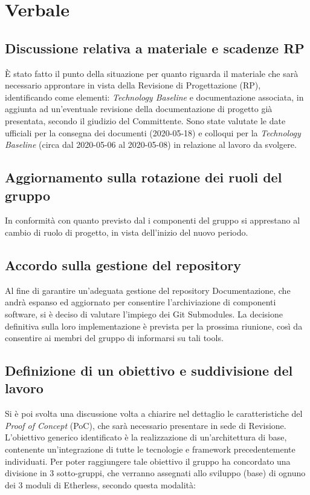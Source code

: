 \section{Verbale}

	\subsection{Discussione relativa a materiale e scadenze RP}
	È stato fatto il punto della situazione per quanto riguarda il materiale che sarà necessario approntare in vista della Revisione di Progettazione (RP), identificando come elementi: \textit{Technology Baseline} e documentazione associata, in aggiunta ad un'eventuale revisione della documentazione di progetto già presentata, secondo il giudizio del Committente.
	Sono state valutate le date ufficiali per la consegna dei documenti (2020-05-18) e colloqui per la \textit{Technology Baseline} (circa dal 2020-05-06 al 2020-05-08) in relazione al lavoro da svolgere.

	\subsection{Aggiornamento sulla rotazione dei ruoli del gruppo}
	In conformità con quanto previsto dal \PdP{} i componenti del gruppo si apprestano al cambio di ruolo di progetto, in vista dell'inizio del nuovo periodo.

	\subsection{Accordo sulla gestione del repository}
	Al fine di garantire un'adeguata gestione del repository Documentazione, che andrà espanso ed aggiornato per consentire l'archiviazione di componenti software, si è deciso di valutare l'impiego dei Git Submodules. La decisione definitiva sulla loro implementazione è prevista per la prossima riunione, così da consentire ai membri del gruppo di informarsi su tali tools.

	\subsection{Definizione di un obiettivo e suddivisione del lavoro}
	Si è poi svolta una discussione volta a chiarire nel dettaglio le caratteristiche del \textit{Proof of Concept} (PoC), che sarà necessario presentare in sede di Revisione. L'obiettivo generico identificato è la realizzazione di un'architettura di base, contenente un'integrazione di tutte le tecnologie e framework precedentemente individuati.
	Per poter raggiungere tale obiettivo il gruppo ha concordato una divisione in 3 sotto-gruppi, che verranno assegnati allo sviluppo (base) di ognuno dei 3 moduli di Etherless, secondo questa modalità:
